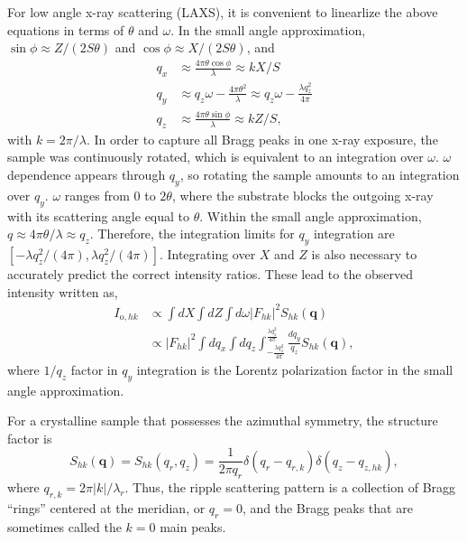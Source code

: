 \documentclass[12pt,letterpaper]{article}
\begin{document}
For low angle x-ray scattering (LAXS), it is convenient to linearlize the above
equations in terms of $\theta$ and $\omega$. In the small angle approximation, 
$\sin\phi \approx Z/(2S\theta)$ and $\cos\phi \approx X/(2S\theta)$, and
\begin{align}
  q_x &\approx \frac{4\pi\theta\cos\phi}{\lambda} \approx kX/S \\
  q_y &\approx q_z\omega -\frac{4\pi\theta^2}{\lambda} \approx q_z\omega - \frac{\lambda q_z^2}{4\pi}\\
  q_z &\approx \frac{4\pi\theta\sin\phi}{\lambda} \approx kZ/S,
\end{align}
with $k=2\pi/\lambda$. 
In order to capture all Bragg peaks in one x-ray exposure, 
the sample was continuously rotated, which is equivalent to an integration over 
$\omega$. $\omega$ dependence appears through $q_y$, so rotating the 
sample amounts to an integration over $q_y$. $\omega$ ranges from 0 to
$2\theta$, where the substrate blocks the outgoing x-ray with its scattering
angle equal to $\theta$. Within the small angle approximation, 
$q \approx 4\pi\theta/\lambda \approx q_z$. Therefore, the integration limits 
for $q_y$ integration are $[-\lambda q_z^2/(4\pi), \lambda q_z^2/(4\pi)]$.
Integrating over $X$ and $Z$ is also necessary to accurately 
predict the correct intensity ratios. These lead to the observed intensity
written as,
\begin{align}
  I_{\mathrm{o},hk} 
    &\propto \int dX \int dZ \int d\omega |F_{hk}|^2 S_{hk}(\mathbf{q}) \nonumber \\
    &\propto |F_{hk}|^2 \int dq_x \int dq_z 
             \int_{-\frac{\lambda q_z^2}{4\pi}}^{\frac{\lambda q_z^2}{4\pi}} \frac{dq_y}{q_z} 
             S_{hk}(\mathbf{q}),
\end{align}
where $1/q_z$ factor in $q_y$ integration is the Lorentz polarization factor
in the small angle approximation. 

For a crystalline sample that possesses the azimuthal symmetry, the
structure factor is  
\begin{equation}
  S_{hk}(\mathbf{q}) = S_{hk}(q_r,q_z) 
  = \frac{1}{2\pi q_r}\delta(q_r-q_{r,k})\delta(q_z-q_{z,hk}),
\end{equation} 
where $q_{r,k}=2\pi |k|/\lambda_r$. Thus, the ripple scattering pattern is a 
collection of Bragg ``rings'' centered at the meridian, or $q_r=0$, and the 
Bragg peaks that are sometimes called the $k=0$ main peaks.  
\end{document}
